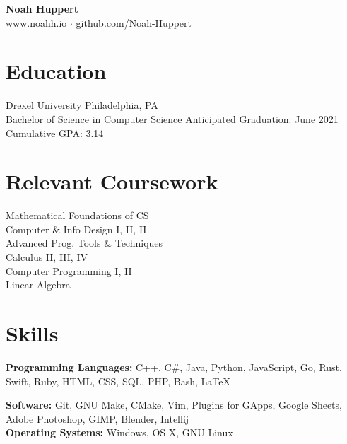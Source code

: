 \documentclass[10pt]{article}
\begin{document}

\centering
	\textbf{Noah Huppert} \\
	
	www.noahh.io $\cdot$ github.com/Noah-Huppert


\begin{flushleft}

\section{Education}
	Drexel University \hfill Philadelphia, PA \\
	Bachelor of Science in Computer Science \hfill Anticipated Graduation: June 2021 \\
	Cumulative GPA: 3.14

\section{Relevant Coursework}
	\begin{addmargin}[1em]{1em}
	\begin{multicols}{3}
		Mathematical Foundations of CS \\
		Computer \& Info Design I, II, II \\

		Advanced Prog. Tools \& Techniques \\
		Calculus II, III, IV \\

		Computer Programming I, II \\
		Linear Algebra 
	\end{multicols} 
	\end{addmargin}


\section{Skills}
	\textbf{Programming Languages:} C++, C\#, Java, Python, JavaScript, Go, Rust, Swift, Ruby, HTML, CSS, SQL, PHP, Bash, LaTeX

	\textbf{Software:} Git, GNU Make, CMake, Vim, Plugins for GApps, Google Sheets, Adobe Photoshop, GIMP, Blender, Intellij \\

	\textbf{Operating Systems:} Windows, OS X, GNU Linux


\end{flushleft}
\end{document}
